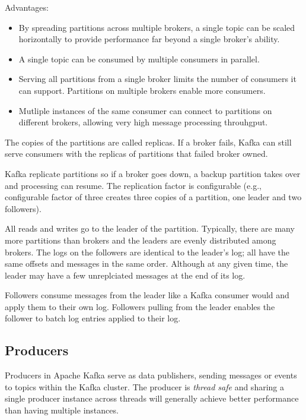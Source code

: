 Advantages:

\begin{itemize}
    \item   By spreading partitions across multiple brokers, a single topic can
            be scaled horizontally to provide performance far beyond a single
            broker's ability.
    \item   A single topic can be consumed by multiple consumers in parallel.
    \item   Serving all partitions from a single broker limits the number of
            consumers it can support. Partitions on multiple brokers enable
            more consumers.
    \item   Mutliple instances of the same consumer can connect to partitions
            on different brokers, allowing very high message processing
            throuhgput.
\end{itemize}

The copies of the partitions are called replicas. If a broker fails, Kafka
can still serve consumers with the replicas of partitions that failed broker
owned.

Kafka replicate partitions so if a broker goes down, a backup partition takes
over and processing can resume. The replication factor is configurable
(e.g., configurable factor of three creates three copies of a partition, one
leader and two followers).

All reads and writes go to the leader of the partition. Typically, there are
many more partitions than brokers and the leaders are evenly distributed among
brokers. The logs on the followers are identical to the leader's log; all have
the same offsets and messages in the same order. Although at any given time,
the leader may have a few unreplciated messages at the end of its log.

Followers consume messages from the leader like a Kafka consumer would and
apply them to their own log. Followers pulling from the leader enables the
follower to batch log entries applied to their log.

\subsection{Producers}

Producers in Apache Kafka serve as data publishers, sending messages or events
to topics within the Kafka cluster.
The producer is \textit{thread safe} and sharing a single producer instance
across threads will generally achieve better performance than having multiple
instances.

